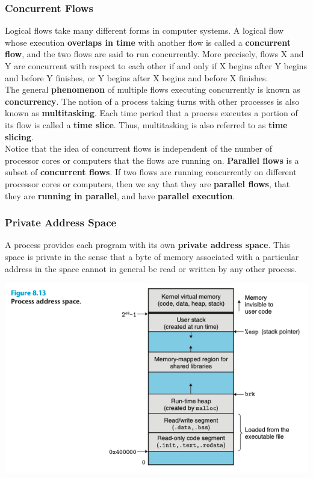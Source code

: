 \documentclass[11pt]{article}
\begin{document}
\subsubsection{Concurrent Flows}
\label{sec:org91bccd3}
Logical flows take many different forms in computer systems. A logical flow whose execution \textbf{overlaps in time} with another flow is called a \textbf{concurrent flow}, and the two flows are said to run concurrently. More precisely, flows X and Y are concurrent with respect to each other if and only if X begins after Y begins and before Y finishes, or Y begins after X begins and before X finishes.\\


The general \textbf{phenomenon} of multiple flows executing concurrently is known as \textbf{concurrency}. The notion of a process taking turns with other processes is also known as \textbf{multitasking}. Each time period that a process executes a portion of its flow is called a \textbf{time slice}. Thus, multitasking is also referred to as \textbf{time slicing}.\\


Notice that the idea of concurrent flows is independent of the number of processor cores or computers that the flows are running on. \textbf{Parallel flows} is a subset of \textbf{concurrent flows}. If two flows are running concurrently on different processor cores or computers, then we say that they are \textbf{parallel flows}, that they are \textbf{running in parallel}, and have \textbf{parallel execution}.\\

\subsubsection{Private Address Space}
\label{sec:org69a4fa7}
A process provides each program with its own \textbf{private address space}. This space is private in the sense that a byte of memory associated with a particular address in the space cannot in general be read or written by any other process.\\

\begin{center}
\includegraphics[width=.9\linewidth]{pics/figure8.13-process-address-space.png}
\end{center}
\end{document}
